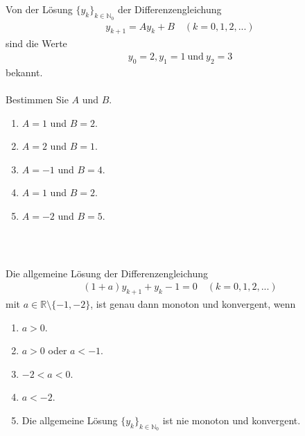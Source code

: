 \subsection*{}
Von der Lösung $ \{y_k\}_{k \in \mathbb{N}_0} $ der Differenzengleichung
\begin{align*}
	y_{k+1} = A y_k + B \quad (k = 0,1,2,...)
\end{align*}
sind die Werte
\begin{align*}
	y_0 = 2, y_1 = 1 \ \textrm{und} \ y_2 = 3
\end{align*}
bekannt.\\
\\
Bestimmen Sie $ A $ und $ B $.
\renewcommand{\labelenumi}{(\alph{enumi})}
\begin{enumerate}
\item
$ A=1 $ und $ B=2 $.
\item
$ A=2 $ und $ B=1 $.	
\item 
$ A=-1 $ und $ B=4 $.
\item
$ A=1 $ und $ B=2 $.
\item
$ A=-2 $ und $ B=5 $.
\end{enumerate}
\ \\
\subsection*{}
Die allgemeine Lösung der  Differenzengleichung
\begin{align*}
(1+a) y_{k+1} + y_k -1 = 0
\quad (k = 0,1,2,...)
\end{align*}
mit $ a \in \mathbb{R} \setminus \{-1,-2\} $, ist genau dann monoton und konvergent, wenn
\renewcommand{\labelenumi}{(\alph{enumi})}
\begin{enumerate}
	\item
	$ a > 0 $.
	\item
	$ a >0 $ oder $ a < -1 $.	
	\item 
	$ -2 < a < 0 $.
	\item
	$ a < -2 $.
	\item 
	Die allgemeine Lösung $ \{y_k\}_{k \in \mathbb{N}_0} $ ist nie monoton und konvergent.
\end{enumerate}